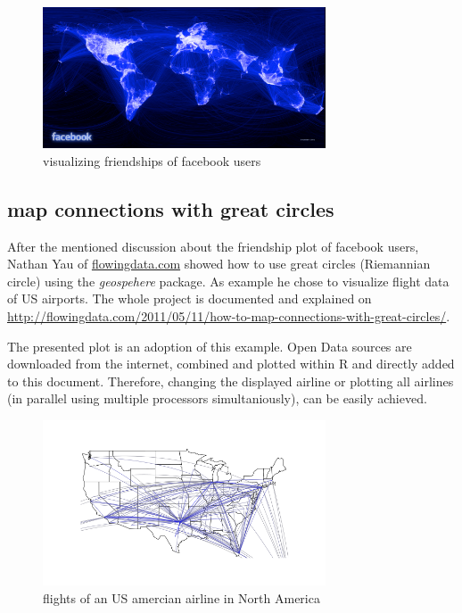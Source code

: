 \documentclass{ifacconf}
\begin{document}
\begin{figure}[h]
\begin{center}
\includegraphics[width=8.4cm]{pics/facebook.png}    %
\caption{visualizing friendships of facebook users} 
\label{fig:facebook}
\end{center}
\end{figure}

\subsection{map connections with great circles}
After the mentioned discussion about the friendship plot of facebook users,
Nathan Yau of \url{flowingdata.com} showed how to use great circles
(Riemannian circle) using the \textit{geospehere} package. As example he chose to
visualize flight data of US airports. The whole project is documented and explained
on \url{http://flowingdata.com/2011/05/11/how-to-map-connections-with-great-circles/}.

The presented plot is an adoption of this example. Open Data sources are downloaded from
the internet, combined and plotted within R and directly added to this document.
Therefore, changing the displayed airline or plotting all airlines (in parallel using
multiple processors simultaniously), can be easily achieved.


\begin{figure}[h]
\begin{center}
\includegraphics[width=8.4cm]{pics/flights.png}    %
\caption{flights of an US amercian airline in North America} 
\label{fig:flights}
\end{center}
\end{figure}
\end{document}
